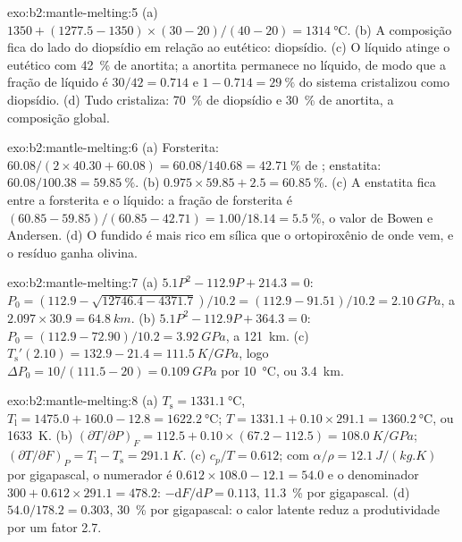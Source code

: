 \begin{solution}{exo:b2:mantle-melting:5}
(a) $1350 + (1277.5 - 1350)\times(30 - 20)/(40 - 20) = \qty{1314}{\celsius}$.
(b) A composição fica do lado do diopsídio em relação ao eutético: diopsídio.
(c) O líquido atinge o eutético com \qty{42}{\percent} de anortita; a anortita
permanece no líquido, de modo que a fração de líquido é $30/42 = 0.714$ e $1 - 0.714 =
\qty{29}{\percent}$ do sistema cristalizou como diopsídio. (d) Tudo
cristaliza: \qty{70}{\percent} de diopsídio e \qty{30}{\percent} de anortita, a
composição global.
\end{solution}

\begin{solution}{exo:b2:mantle-melting:6}
(a) Forsterita: $60.08/(2\times40.30 + 60.08) = 60.08/140.68 =
\qty{42.71}{\percent}$ de ; enstatita: $60.08/100.38 = \qty{59.85}{\percent}$.
(b) $0.975\times59.85 + 2.5 = \qty{60.85}{\percent}$. (c) A enstatita fica entre a
forsterita e o líquido: a fração de forsterita é $(60.85 - 59.85)/(60.85 -
42.71) = 1.00/18.14 = \qty{5.5}{\percent}$, o valor de Bowen e Andersen. (d) O
fundido é mais rico em sílica que o ortopiroxênio de onde vem, e o resíduo
ganha olivina.
\end{solution}

\begin{solution}{exo:b2:mantle-melting:7}
(a) $5.1P^2 - 112.9P + 214.3 = 0$: $P_0 = (112.9 - \sqrt{12746.4 -
4371.7})/10.2 = (112.9 - 91.51)/10.2 = \qty{2.10}{GPa}$, a $2.097\times30.9 =
\qty{64.8}{km}$. (b) $5.1P^2 - 112.9P + 364.3 = 0$: $P_0 = (112.9 -
72.90)/10.2 = \qty{3.92}{GPa}$, a \qty{121}{km}. (c) $T_{\mathrm s}'(2.10) = 132.9
- 21.4 = \qty{111.5}{K/GPa}$, logo $\Delta P_0 = 10/(111.5 - 20) = \qty{0.109}{GPa}$
por \qty{10}{\celsius}, ou \qty{3.4}{km}.
\end{solution}

\begin{solution}{exo:b2:mantle-melting:8}
(a) $T_{\mathrm s} = \qty{1331.1}{\celsius}$, $T_{\mathrm l} = 1475.0 + 160.0 -
12.8 = \qty{1622.2}{\celsius}$; $T = 1331.1 + 0.10\times291.1 =
\qty{1360.2}{\celsius}$, ou \qty{1633}{K}. (b) $(\partial T/\partial P)_F = 112.5
+ 0.10\times(67.2 - 112.5) = \qty{108.0}{K/GPa}$; $(\partial T/\partial F)_P =
T_{\mathrm l} - T_{\mathrm s} = \qty{291.1}{K}$. (c) $c_p/T = 0.612$; com $\alpha/\rho
= \qty{12.1}{J/(kg.K)}$ por gigapascal, o numerador é $0.612\times108.0 - 12.1
= 54.0$ e o denominador $300 + 0.612\times291.1 = 478.2$: $-\mathrm dF/\mathrm
dP = 0.113$, \qty{11.3}{\percent} por gigapascal. (d) $54.0/178.2 = 0.303$,
\qty{30}{\percent} por gigapascal: o calor latente reduz a produtividade por um
fator 2.7.
\end{solution}

